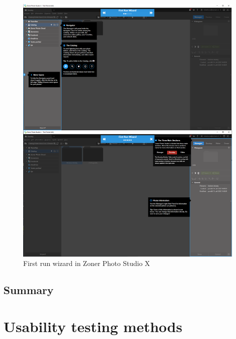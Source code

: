\documentclass[a4paper,10pt,twoside]{article}
\begin{document}
\vspace{0.3cm}
\begin{figure}[hbt!] 
\begin{center}
\includegraphics[width=15cm]{../pictures/zoner.png} 
\caption[First run wizard in Zoner Photo Studio X]{First run wizard in Zoner Photo Studio X}
\label{fig:zoner}
\end{center}
\end{figure}

\newpage
\vspace*{-1cm}
\subsection{Summary}


\newpage
\vspace*{-1cm}
\section{Usability testing methods}
\label{sec:usability_testing}
\end{document}
